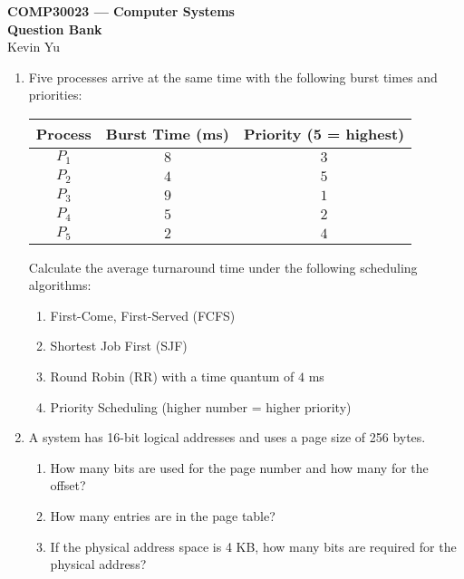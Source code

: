 \documentclass[12pt]{article}
\begin{document}
\begin{center}
    \LARGE \textbf{COMP30023 — Computer Systems}\\
    \normalsize\vspace{1em}
    \large \textbf{Question Bank}\\
    \normalsize\vspace{0.8em}
    Kevin Yu
\end{center}

\vspace{1em}

\begin{enumerate}[label=\textbf{Q\arabic*.}]
    \item Five processes arrive at the same time with the following burst times and priorities:
    \begin{table}[h!]
        \centering
        \begin{tabular}{|c|c|c|}
        \hline
        \textbf{Process} & \textbf{Burst Time (ms)} & \textbf{Priority (5 = highest)} \\ \hline
        $P_1$      & $8$      & $3$      \\ \hline
        $P_2$      & $4$      & $5$      \\ \hline
        $P_3$      & $9$      & $1$      \\ \hline
        $P_4$      & $5$      & $2$      \\ \hline
        $P_5$      & $2$      & $4$      \\ \hline
        \end{tabular}
        \label{tab:processes}
    \end{table}

    Calculate the average turnaround time under the following scheduling algorithms:
    \begin{enumerate}[label=(\alph*)]
        \item First-Come, First-Served (FCFS)\\
        \item Shortest Job First (SJF)\\
        \item Round Robin (RR) with a time quantum of $4$ ms\\
        \item Priority Scheduling (higher number = higher priority)\\
    \end{enumerate}


    \item A system has 16-bit logical addresses and uses a page size of 256 bytes.
    \begin{enumerate}[label=(\alph*)]
        \item How many bits are used for the page number and how many for the offset?\\
        \item How many entries are in the page table?\\
        \item If the physical address space is 4 KB, how many bits are required for the physical address?\\
    \end{enumerate}




\end{enumerate}
\end{document}
